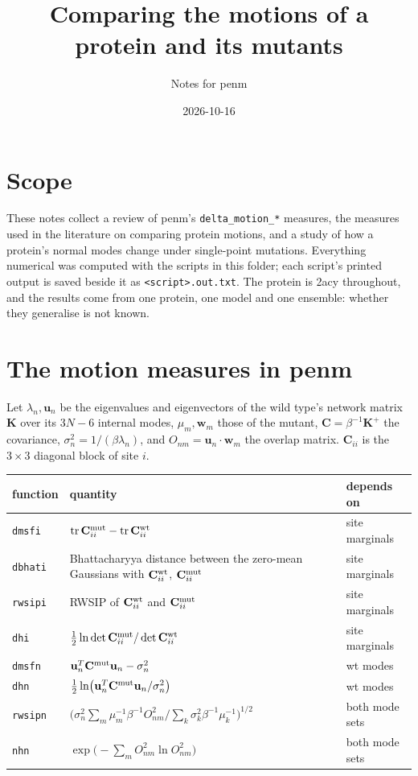 \documentclass[11pt]{article}
\title{Comparing the motions of a protein and its mutants}
\author{Notes for penm}
\date{2026-10-16}
\newcommand{\uu}{\mathbf{u}}
\newcommand{\KK}{\mathbf{K}}
\newcommand{\CC}{\mathbf{C}}
\newcommand{\code}[1]{\texttt{#1}}
\begin{document}
\maketitle

\section{Scope}

These notes collect a review of penm's \code{delta\_motion\_*} measures, the measures
used in the literature on comparing protein motions, and a study of how a protein's normal
modes change under single-point mutations.
Everything numerical was computed with the scripts in this folder; each script's printed
output is saved beside it as \code{<script>.out.txt}.
The protein is 2acy throughout, and the results come from one protein, one model and one
ensemble: whether they generalise is not known.

\section{The motion measures in penm}

Let $\lambda_n,\uu_n$ be the eigenvalues and eigenvectors of the wild type's network matrix
$\KK$ over its $3N-6$ internal modes, $\mu_m,\mathbf{w}_m$ those of the mutant,
$\CC=\beta^{-1}\KK^{+}$ the covariance, $\sigma_n^2 = 1/(\beta\lambda_n)$, and
$O_{nm}=\uu_n\cdot\mathbf{w}_m$ the overlap matrix.
$\CC_{ii}$ is the $3\times3$ diagonal block of site $i$.

\begin{center}
\begin{tabular}{lp{9.2cm}l}
\toprule
function & quantity & depends on \\
\midrule
\code{dmsfi} & $\operatorname{tr}\CC^{\rm mut}_{ii}-\operatorname{tr}\CC^{\rm wt}_{ii}$ & site marginals \\
\code{dbhati} & Bhattacharyya distance between the zero-mean Gaussians with $\CC^{\rm wt}_{ii}$, $\CC^{\rm mut}_{ii}$ & site marginals \\
\code{rwsipi} & RWSIP of $\CC^{\rm wt}_{ii}$ and $\CC^{\rm mut}_{ii}$ & site marginals \\
\code{dhi} & $\tfrac12\ln\det\CC^{\rm mut}_{ii}/\det\CC^{\rm wt}_{ii}$ & site marginals \\
\code{dmsfn} & $\uu_n^{T}\CC^{\rm mut}\uu_n-\sigma_n^2$ & wt modes \\
\code{dhn} & $\tfrac12\ln\bigl(\uu_n^{T}\CC^{\rm mut}\uu_n/\sigma_n^2\bigr)$ & wt modes \\
\code{rwsipn} & $\bigl(\sigma_n^2\sum_m\mu_m^{-1}\beta^{-1}O_{nm}^2\big/\sum_k\sigma_k^2\beta^{-1}\mu_k^{-1}\bigr)^{1/2}$ & both mode sets \\
\code{nhn} & $\exp\bigl(-\sum_m O_{nm}^2\ln O_{nm}^2\bigr)$ & both mode sets \\
\bottomrule
\end{tabular}
\end{center}
\end{document}
